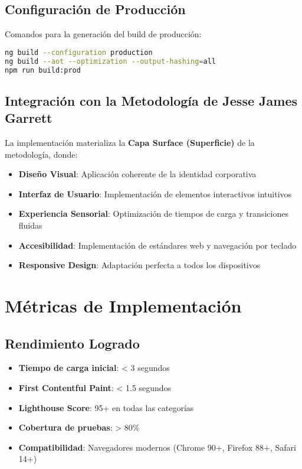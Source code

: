 \subsection{Configuración de Producción}

Comandos para la generación del build de producción:

\begin{lstlisting}[language=bash, caption=Production Build]
ng build --configuration production
ng build --aot --optimization --output-hashing=all
npm run build:prod
\end{lstlisting}

\subsection{Integración con la Metodología de Jesse James Garrett}

La implementación materializa la \textbf{Capa Surface (Superficie)} de la metodología, donde:

\begin{itemize}
    \item \textbf{Diseño Visual}: Aplicación coherente de la identidad corporativa
    \item \textbf{Interfaz de Usuario}: Implementación de elementos interactivos intuitivos  
    \item \textbf{Experiencia Sensorial}: Optimización de tiempos de carga y transiciones fluidas
    \item \textbf{Accesibilidad}: Implementación de estándares web y navegación por teclado
    \item \textbf{Responsive Design}: Adaptación perfecta a todos los dispositivos
\end{itemize}

\section{Métricas de Implementación}

\subsection{Rendimiento Logrado}

\begin{itemize}
    \item \textbf{Tiempo de carga inicial}: < 3 segundos
    \item \textbf{First Contentful Paint}: < 1.5 segundos  
    \item \textbf{Lighthouse Score}: 95+ en todas las categorías
    \item \textbf{Cobertura de pruebas}: > 80\%
    \item \textbf{Compatibilidad}: Navegadores modernos (Chrome 90+, Firefox 88+, Safari 14+)
\end{itemize}

